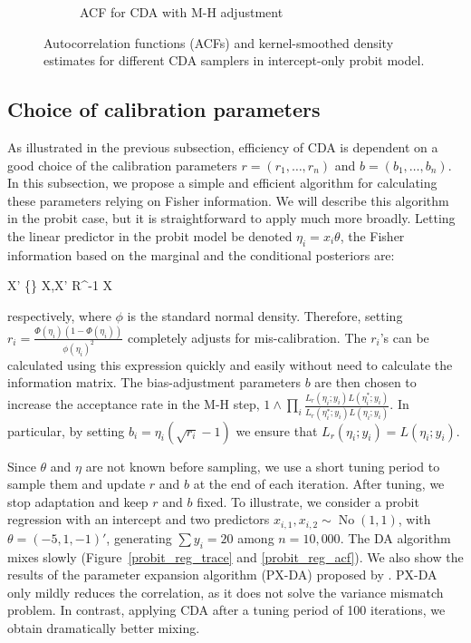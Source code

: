 \documentclass[10pt]{article}
\newcommand{\be}{\begin{equs}}
\newcommand{\ee}{\end{equs}}
\DeclareMathOperator{\No}{No}
\DeclareMathOperator{\diag}{diag}
\begin{document}
\begin{figure}[H]
\begin{subfigure}[b]{0.32\textwidth}
  \caption{ACF for CDA with M-H adjustment}
   \label{probit_demo_intercept_posteriorsample}
\end{subfigure}
  \hfill
  \caption{ Autocorrelation functions (ACFs) and kernel-smoothed density estimates for different CDA samplers in intercept-only probit model.}
 \label{probit_demo_intercept}
 \end{figure}


\subsection{Choice of calibration parameters} %

As illustrated in the previous subsection, efficiency of CDA is dependent on a good choice of the calibration parameters $r=(r_1,\ldots,r_n)$ and $b=(b_1,\ldots,b_n)$.  In this subsection, we propose a simple and efficient algorithm for calculating these parameters relying on Fisher information.  We will describe this algorithm in the probit case, but it is straightforward to apply much more broadly.  Letting the linear predictor in the probit model be denoted $\eta_i = x_i\theta$, the Fisher information based on the marginal and the conditional posteriors are:
\be
X' \diag\bigg\{\bigg\} X,\quad \quad X' R^{-1} X
\ee
respectively, where $\phi$ is the standard normal density. Therefore, setting $r_i = \frac{\Phi(\eta_i)(1- \Phi(\eta_i))} {\phi(\eta_i)^2}$ completely adjusts for mis-calibration.  The $r_i$'s can be calculated using this expression quickly and easily without need to calculate the information matrix.
The bias-adjustment parameters $b$ are then chosen to increase the acceptance rate in the M-H step, $1\wedge \prod_i \frac{   L_r(\eta_i;y_i) L(\eta_i^*;y_i)}{ L_r(\eta_i^*;y_i)L(\eta_i;y_i) }$. In particular, by setting $b_i = \eta_i (\sqrt{r_i}-1)$ we ensure that $L_r(\eta_i;y_i) = L(\eta_i;y_i)$.

Since $\theta$ and $\eta$ are not known before sampling, we use a short tuning period to sample them and update $r$ and $b$ at the end of each iteration.  After tuning, we stop adaptation and keep $r$ and $b$ fixed.  To illustrate, we consider a probit regression with an intercept and two predictors $x_{i,1},x_{i,2}\sim \No(1,1)$, with $\theta=(-5,1,-1)'$, generating $\sum y_i=20$ among $n=10,000$. The \cite{albert1993bayesian} DA algorithm mixes slowly (Figure~\ref{probit_reg_trace} and \ref{probit_reg_acf}). We also show the 
results of the parameter expansion algorithm (PX-DA) proposed by \cite{liu1999parameter}. PX-DA only mildly reduces the correlation, as it does not solve the variance mismatch problem.  In contrast, applying CDA after a tuning period of 100 iterations, we obtain dramatically better mixing.
\end{document}
